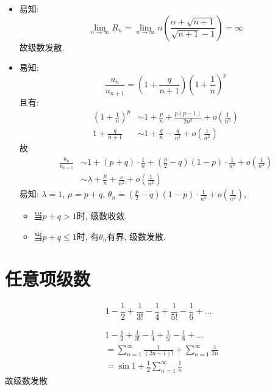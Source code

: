 \begin{solution}
    \begin{itemize}
        \item 易知: \[
                \lim_{n \to \infty} R_{n}=\lim_{n \to \infty} n\left(
                \frac{\alpha+\sqrt{n+1}}{\sqrt{n+1}-1}  \right)= \infty
            \]
            故级数发散.
        \item 易知: \[
                \frac{u_{n}}{u_{n+1}}= \left( 1+\frac{q}{n+1} \right)\left(
                1+\frac{1}{n} \right)^{p}
            \]
            且有:
            \begin{align}
                \left( 1+\frac{1}{n} \right)^{p} & \sim 1+ \frac{p}{n}+
                \frac{p(p-1)}{2n^{2}} + o(\frac{1}{n^{2}})
                \\
                1 + \frac{q}{n+1}                & \sim
                1+\frac{q}{n}-\frac{q}{n^{2}}+o(\frac{1}{n^{2}})
            \end{align}
            故:
            \begin{align*}
                \frac{u_{n}}{u_{n+1}} & \sim  1+(p+q)\cdot \frac{1}{n}+\left(
                \frac{p}{2}-q \right)\left( 1-p\right) \cdot
                \frac{1}{n^{2}}+o(\frac{1}{n^{2}})
                \\
                & \sim \lambda + \frac{\mu}{n} + \frac{\nu}{n^{2}} +
                o(\frac{1}{n^{2}})
            \end{align*}
            易知: \(\lambda = 1\), \(\mu = p+q\), \(\theta_{n} =
                \left(\frac{p}{2}-q
            \right)\left( 1-p\right)\cdot\frac{1}{n^{2}}+o(\frac{1}{n^{2}})\),
            \begin{itemize}
                \item 当\(p+q > 1\)时, 级数收敛.
                \item 当\(p+q \le 1\)时, 有\(\theta_n\)有界, 级数发散.
            \end{itemize}
    \end{itemize}

\end{solution}
\section{任意项级数}
\[
    1 - \frac{1}{2} + \frac{1}{3!} - \frac{1}{4} + \frac{1}{5!} -
    \frac{1}{6} + \ldots
\]

\begin{align*}
    & 1 - \frac{1}{2} + \frac{1}{3!} - \frac{1}{4} + \frac{1}{5!} -
    \frac{1}{6} + \ldots                                             \\
    & = \sum_{n=1}^{\infty} \frac{1}{(2n-1)!} + \sum_{n=1}^{\infty}
    \frac{1}{2n}
    \\ &= \sin 1 + \frac{1}{2} \sum_{n=1}^{\infty} \frac{1}{n}
\end{align*}
故级数发散


